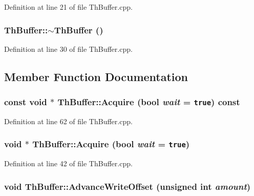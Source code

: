 Definition at line 21 of file ThBuffer.cpp.\hypertarget{class_th_buffer_be72d88fcd65dc1a38f235bf62cc9389}{
\subsubsection[{$\sim$ThBuffer}]{\setlength{\rightskip}{0pt plus 5cm}ThBuffer::$\sim$ThBuffer ()}}
\label{class_th_buffer_be72d88fcd65dc1a38f235bf62cc9389}




Definition at line 30 of file ThBuffer.cpp.

\subsection{Member Function Documentation}
\hypertarget{class_th_buffer_3120cde7f42cb70fe65d91a41692f772}{
\subsubsection[{Acquire}]{\setlength{\rightskip}{0pt plus 5cm}const void $\ast$ ThBuffer::Acquire (bool {\em wait} = {\tt true}) const}}
\label{class_th_buffer_3120cde7f42cb70fe65d91a41692f772}




Definition at line 62 of file ThBuffer.cpp.\hypertarget{class_th_buffer_1e98d61991e2ff9dc94dcea0e1381cfd}{
\subsubsection[{Acquire}]{\setlength{\rightskip}{0pt plus 5cm}void $\ast$ ThBuffer::Acquire (bool {\em wait} = {\tt true})}}
\label{class_th_buffer_1e98d61991e2ff9dc94dcea0e1381cfd}




Definition at line 42 of file ThBuffer.cpp.\hypertarget{class_th_buffer_606930e690108540fafbb73857434aad}{
\subsubsection[{AdvanceWriteOffset}]{\setlength{\rightskip}{0pt plus 5cm}void ThBuffer::AdvanceWriteOffset (unsigned int {\em amount})}}
\label{class_th_buffer_606930e690108540fafbb73857434aad}




